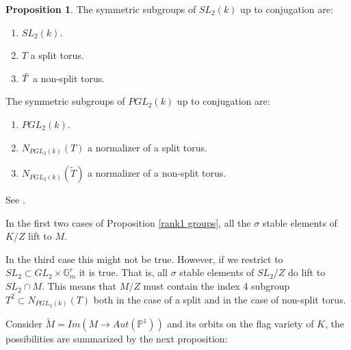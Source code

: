 \documentclass[12pt]{article}
\newcommand{\<}{\langle}
\renewcommand{\>}{\rangle}
\theoremstyle{plain}
\theoremstyle{definition}
\newtheorem{prop}[theorem]{Proposition}
\begin{document}
\begin{prop}
    The symmetric subgroups of $SL_2(k)$ up to conjugation are:
    \begin{enumerate}
        \item $SL_2(k)$.
        \item $T$ a split torus.
        \item $\Tilde{T}$ a non-split torus.
    \end{enumerate}

    The symmetric subgroups of $PGL_2(k)$ up to conjugation are:
    \begin{enumerate}
        \item $PGL_2(k)$.
        \item $N_{PGL_2(k)}(T)$ a normalizer of a split torus.
        \item $N_{PGL_2(k)}(\tilde{T})$ a normalizer of a non-split torus. 
    \end{enumerate}
    See \cite{AGB-120006486}.

\end{prop}

In the first two cases of Proposition \ref{rank1 groups}, all the $\sigma$ stable elements of $K/Z$ lift to $M$. 

In the third case this might not be true. However, if we restrict to $SL_2\subset GL_2\times \mathbb{G}^r_m$ it is true. That is, all $\sigma$ stable elements of $SL_2/Z$ do lift to $SL_2\cap M$. This means that $M/Z$ must contain the index 4 subgroup $T^2\subset N_{PGL_2(k)}(T)$ both in the case of a split and in the case of non-split torus.

 
Consider $\tilde{M}=Im(M\rightarrow Aut(\mathbb{P}^1))$ and its orbits on the flag variety of $K$, the possibilities are summarized by the next proposition:
\end{document}
